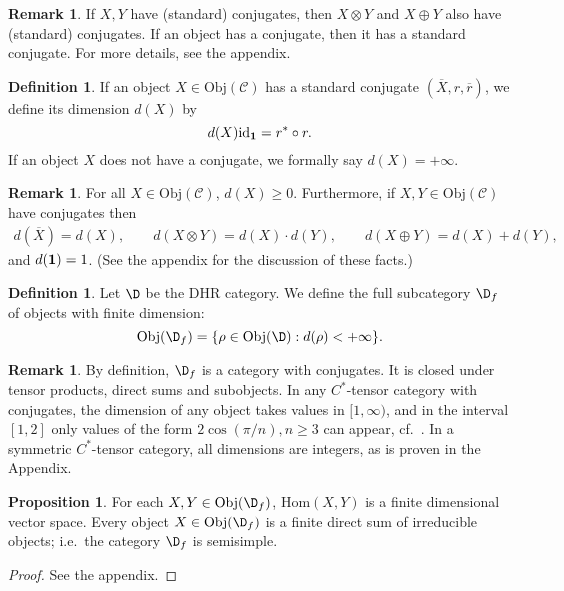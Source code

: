 \documentclass[11pt]{article}
\theoremstyle{definition}
\newtheorem{prop}[thm]{Proposition}
\theoremstyle{definition}
\newtheorem{defn}[thm]{Definition}
\newtheorem{note}[thm]{Remark}
\theoremstyle{remark}
\newcommand{\Obj}{\mathrm{Obj}}
\def\2#1{{\mathcal #1}}
\def\1#1{{\bf #1}}
\def\ol#1{{\overline #1}}
\newcommand{\Hom}{\mathrm{Hom}}
\def\id{\mathrm{id}}
\begin{document}
\begin{note} If $X,Y$ have (standard) conjugates, then
  $X\otimes Y$ and $X\oplus Y$ also have (standard)
  conjugates.  If an object has a conjugate, then it
  has a standard conjugate.  For more details, see the
  appendix.
\end{note}

\begin{defn} If an object $X\in \Obj (\2C )$ has a standard conjugate $(\ol X,r,\ol r
  )$, we define its dimension $d(X)$ by
$$d(X)\id _{\11}=r^*\circ r . $$  
If an object $X$ does not have a conjugate, we formally say $d(X)=+\infty$.  \end{defn}

\begin{note} For all $X\in \Obj (\2C )$, $d(X)\geq 0$.
  Furthermore, if $X ,Y\in \Obj (\2C )$ have conjugates
  then
\begin{eqnarray*}
  d(\ol X)=d(X) ,\qquad d(X\otimes Y)=d(X)\cdot d(Y),\qquad d(X\oplus Y)=d(X)+d(Y)
  ,\end{eqnarray*}
and $d(\11 )=1$.  (See the appendix for the discussion of these facts.)  \end{note}

\begin{defn} Let $\D$ be the DHR category.  We define
  the full subcategory $\D _f$ of objects with finite
  dimension:
$$ \Obj (\D _f)=\{ \rho \in \Obj (\D ):d(\rho )<+\infty \} .$$ 
\end{defn}

\begin{note} 
By definition, $\D_f$ is a category with conjugates. It is closed under tensor products, direct sums
and subobjects. In any $C^*$-tensor category with conjugates, the dimension of any object takes
values in $[1,\infty)$, and in the interval $[1,2]$ only values of the form $2\cos(\pi/n), n\ge 3$
can appear, cf.\ \cite{LR}. In a symmetric $C^*$-tensor category, all dimensions are integers, as is
proven in the Appendix.
\end{note}

\begin{prop} \label{prop-fd} For each $X,Y\in \Obj (\D
  _f)$, $\Hom (X,Y)$ is a finite dimensional vector
  space.  Every object $X\in \Obj (\D _f)$ is a finite
  direct sum of irreducible objects; i.e.\ the category
  $\D _f$ is semisimple.  \label{semisimple}
\end{prop}

\begin{proof} See the appendix.  \end{proof}
\end{document}
